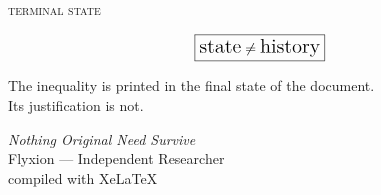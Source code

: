 \documentclass[
  11pt,
  a4paper,
  DIV=12,
  BCOR=0mm,
  parskip=half-
]{scrartcl}
\newcommand{\enginename}{unknown engine}
\renewcommand{\enginename}{LuaLaTeX}
\renewcommand{\enginename}{XeLaTeX}
\theoremstyle{definition}
\theoremstyle{plain}
\theoremstyle{remark}
\begin{document}
\clearpage
\thispagestyle{empty}

\vspace*{\fill}

\begin{center}

{\small\scshape terminal state}

\vspace{2em}

\[
  \boxed{
    \text{\Large state}
    \neq
    \text{\Large history}
  }
\]

\vspace{2em}

{\small
The inequality is printed in the final state of the document.\\
Its justification is not.
}

\vspace{3em}

{\footnotesize
\textit{Nothing Original Need Survive}\\
Flyxion --- Independent Researcher\\
compiled with \enginename
}

\end{center}

\vspace*{\fill}

\end{document}
